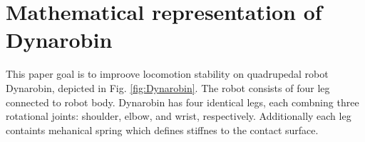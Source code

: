 
\section{Mathematical representation of Dynarobin}\label{sec:Dynarobin}

This paper goal is to improove locomotion stability on quadrupedal robot Dynarobin, depicted in Fig. \ref{fig:Dynarobin}. The robot consists of four leg connected to robot body. Dynarobin has four identical legs, each combning three rotational joints: shoulder, elbow, and wrist, respectively. Additionally each leg containts mehanical spring which defines stiffnes to the contact surface.
